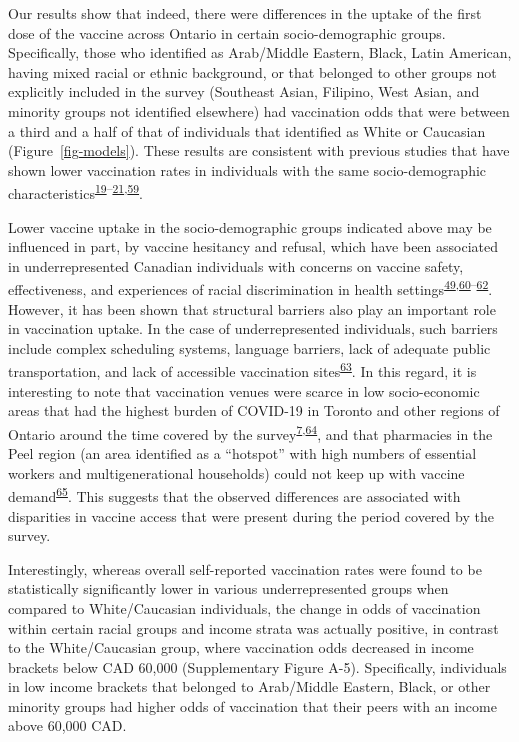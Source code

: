\documentclass[
]{article}
\begin{document}
Our results show that indeed, there were differences in the uptake of
the first dose of the vaccine across Ontario in certain
socio-demographic groups. Specifically, those who identified as
Arab/Middle Eastern, Black, Latin American, having mixed racial or
ethnic background, or that belonged to other groups not explicitly
included in the survey (Southeast Asian, Filipino, West Asian, and
minority groups not identified elsewhere) had vaccination odds that were
between a third and a half of that of individuals that identified as
White or Caucasian (Figure~\ref{fig-models}). These results are
consistent with previous studies that have shown lower vaccination rates
in individuals with the same socio-demographic
characteristics\textsuperscript{\protect\hyperlink{ref-guay2022}{19}--\protect\hyperlink{ref-hussain2022}{21},\protect\hyperlink{ref-carter2022}{59}}.

Lower vaccine uptake in the socio-demographic groups indicated above may
be influenced in part, by vaccine hesitancy and refusal, which have been
associated in underrepresented Canadian individuals with concerns on
vaccine safety, effectiveness, and experiences of racial discrimination
in health
settings\textsuperscript{\protect\hyperlink{ref-cnat2022a}{49},\protect\hyperlink{ref-basta2022}{60}--\protect\hyperlink{ref-cnat2023}{62}}.
However, it has been shown that structural barriers also play an
important role in vaccination uptake. In the case of underrepresented
individuals, such barriers include complex scheduling systems, language
barriers, lack of adequate public transportation, and lack of accessible
vaccination
sites\textsuperscript{\protect\hyperlink{ref-njoku2021}{63}}. In this
regard, it is interesting to note that vaccination venues were scarce in
low socio-economic areas that had the highest burden of COVID-19 in
Toronto and other regions of Ontario around the time covered by the
survey\textsuperscript{\protect\hyperlink{ref-bogoch2022}{7},\protect\hyperlink{ref-iveniuk2021}{64}},
and that pharmacies in the Peel region (an area identified as a
``hotspot'' with high numbers of essential workers and multigenerational
households) could not keep up with vaccine
demand\textsuperscript{\protect\hyperlink{ref-gill2022}{65}}. This
suggests that the observed differences are associated with disparities
in vaccine access that were present during the period covered by the
survey.

Interestingly, whereas overall self-reported vaccination rates were
found to be statistically significantly lower in various
underrepresented groups when compared to White/Caucasian individuals,
the change in odds of vaccination within certain racial groups and
income strata was actually positive, in contrast to the White/Caucasian
group, where vaccination odds decreased in income brackets below CAD
60,000 (Supplementary Figure A-5). Specifically, individuals in low
income brackets that belonged to Arab/Middle Eastern, Black, or other
minority groups had higher odds of vaccination that their peers with an
income above 60,000 CAD.
\end{document}

